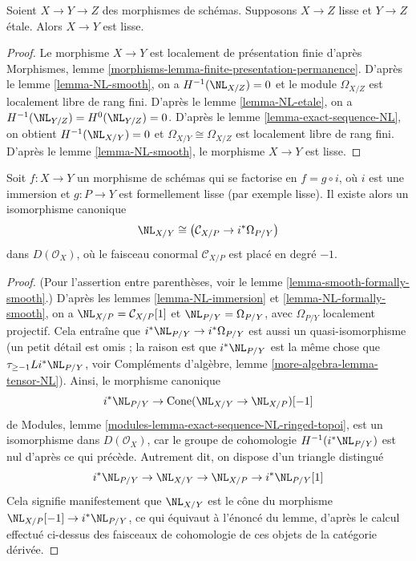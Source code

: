\begin{lemma}
\label{lemma-smooth-etale-permanence}
Soient $X \to Y \to Z$ des morphismes de schémas. Supposons $X \to Z$ lisse
et $Y \to Z$ étale. Alors $X \to Y$ est lisse.
\end{lemma}

\begin{proof}
Le morphisme $X \to Y$ est localement de présentation finie d'après
Morphismes, lemme \ref{morphisms-lemma-finite-presentation-permanence}.
D'après le lemme \ref{lemma-NL-smooth}, on a $H^{-1}(\NL_{X/Z}) = 0$
et le module $\Omega_{X/Z}$ est localement libre de rang fini.
D'après le lemme \ref{lemma-NL-etale}, on a
$H^{-1}(\NL_{Y/Z}) = H^0(\NL_{Y/Z}) = 0$.
D'après le lemme \ref{lemma-exact-sequence-NL}, on obtient
$H^{-1}(\NL_{X/Y}) = 0$ et $\Omega_{X/Y} \cong \Omega_{X/Z}$
est localement libre de rang fini.
D'après le lemme \ref{lemma-NL-smooth}, le morphisme $X \to Y$ est lisse.
\end{proof}

\begin{lemma}
\label{lemma-get-NL}
Soit $f : X \to Y$ un morphisme de schémas qui se factorise
en $f = g \circ i$, où $i$ est une immersion et $g : P \to Y$
est formellement lisse (par exemple lisse). Il existe alors un isomorphisme canonique
$$
\NL_{X/Y} \cong \left(\mathcal{C}_{X/P} \to i^*\Omega_{P/Y}\right)
$$
dans $D(\mathcal{O}_X)$, où le faisceau conormal $\mathcal{C}_{X/P}$
est placé en degré $-1$.
\end{lemma}

\begin{proof}
(Pour l'assertion entre parenthèses, voir le lemme \ref{lemma-smooth-formally-smooth}.)
D'après les lemmes \ref{lemma-NL-immersion} et \ref{lemma-NL-formally-smooth}, on a
$\NL_{X/P} = \mathcal{C}_{X/P}[1]$ et $\NL_{P/Y} = \Omega_{P/Y}$, avec
$\Omega_{P/Y}$ localement projectif. Cela entraîne que
$i^*\NL_{P/Y} \to i^*\Omega_{P/Y}$ est aussi un quasi-isomorphisme
(un petit détail est omis ; la raison est que $i^*\NL_{P/Y}$ est
la même chose que $\tau_{\geq -1}Li^*\NL_{P/Y}$, voir Compléments d'algèbre, lemme
\ref{more-algebra-lemma-tensor-NL}).
Ainsi, le morphisme canonique
$$
i^*\NL_{P/Y} \to \text{Cone}(\NL_{X/Y} \to \NL_{X/P})[-1]
$$
de Modules, lemme \ref{modules-lemma-exact-sequence-NL-ringed-topoi},
est un isomorphisme dans $D(\mathcal{O}_X)$, car le groupe de cohomologie
$H^{-1}(i^*\NL_{P/Y})$ est nul d'après ce qui précède.
Autrement dit, on dispose d'un triangle distingué
$$
i^*\NL_{P/Y} \to \NL_{X/Y} \to \NL_{X/P} \to i^*\NL_{P/Y}[1]
$$
Cela signifie manifestement que $\NL_{X/Y}$ est le cône du morphisme
$\NL_{X/P}[-1] \to i^*\NL_{P/Y}$, ce qui équivaut
à l'énoncé du lemme, d'après le calcul effectué ci-dessus des faisceaux
de cohomologie de ces objets de la catégorie dérivée.
\end{proof}

